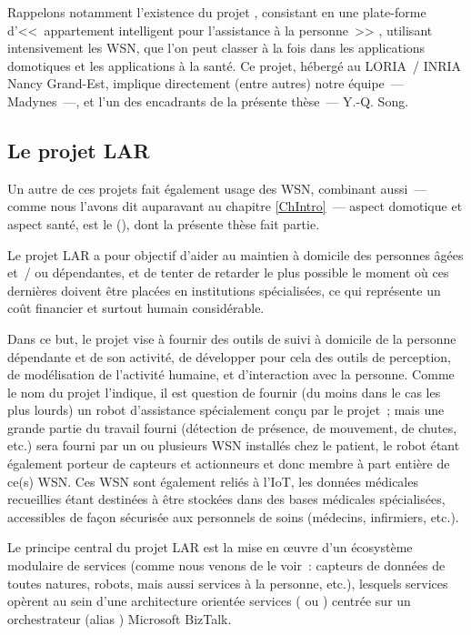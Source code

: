 Rappelons notamment l'existence du projet ,
consistant en une plate-forme d'<<~appartement intelligent pour l'assistance
à la personne~>> \cite{AppartIntelligent}, utilisant intensivement les WSN,
que l'on peut classer à la fois dans les applications domotiques et les
applications à la santé. Ce projet, hébergé au LORIA~/ INRIA Nancy Grand-Est,
implique directement (entre autres) notre équipe~--- Madynes~---, et l'un
des encadrants de la présente thèse~--- Y.-Q. Song.


\subsection{Le projet LAR}
\label{SubsecLAR}

Un autre de ces projets fait également usage des WSN, combinant aussi~---
comme nous l'avons dit auparavant au chapitre \ref{ChIntro}~--- aspect
domotique et aspect santé, est le  (), dont la présente thèse fait partie.

\newpage

Le projet LAR a pour objectif d'aider au maintien à domicile des personnes
âgées et~/ ou dépendantes, et de tenter de retarder le plus possible le
moment où ces dernières doivent être placées en institutions spécialisées,
ce qui représente un coût financier et surtout humain considérable.

Dans ce but, le projet vise à fournir des outils de suivi à domicile
de la personne dépendante et de son activité, de développer pour cela
des outils de perception, de modélisation de l'activité humaine,
et d'interaction avec la personne. Comme le nom du projet l'indique,
il est question de fournir (du moins dans le cas les plus lourds)
un robot d'assistance spécialement conçu par le projet~; mais une
grande partie du travail fourni (détection de présence, de mouvement,
de chutes, etc.) sera fourni par un ou plusieurs WSN installés chez
le patient, le robot étant également porteur de capteurs et actionneurs
et donc membre à part entière de ce(s) WSN. Ces WSN sont également reliés
à l'IoT, les données médicales recueillies étant destinées à être
stockées dans des bases médicales spécialisées, accessibles de façon
sécurisée aux personnels de soins (médecins, infirmiers, etc.).

Le principe central du projet LAR est la mise en {\oe}uvre d'un écosystème
modulaire de services (comme nous venons de le voir~: capteurs de données
de toutes natures, robots, mais aussi services à la personne, etc.),
lesquels services opèrent au sein d'une architecture orientée services
( ou ) centrée sur un
orchestrateur (alias ) Microsoft BizTalk.

